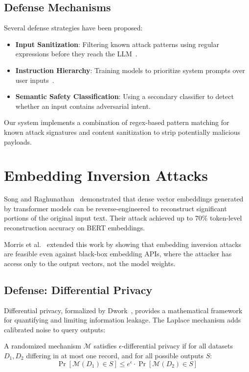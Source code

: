 \subsection{Defense Mechanisms}

Several defense strategies have been proposed:

\begin{itemize}
    \item \textbf{Input Sanitization}: Filtering known attack patterns using regular expressions before they reach the LLM~\cite{liu2023prompt}.
    \item \textbf{Instruction Hierarchy}: Training models to prioritize system prompts over user inputs~\cite{wallace2024instruction}.
    \item \textbf{Semantic Safety Classification}: Using a secondary classifier to detect whether an input contains adversarial intent.
\end{itemize}

Our system implements a combination of regex-based pattern matching for known attack signatures and content sanitization to strip potentially malicious payloads.

\section{Embedding Inversion Attacks}

Song and Raghunathan~\cite{song2020information} demonstrated that dense vector embeddings generated by transformer models can be reverse-engineered to reconstruct significant portions of the original input text. Their attack achieved up to 70\% token-level reconstruction accuracy on BERT embeddings.

Morris et al.~\cite{morris2023text} extended this work by showing that embedding inversion attacks are feasible even against black-box embedding APIs, where the attacker has access only to the output vectors, not the model weights.

\subsection{Defense: Differential Privacy}

Differential privacy, formalized by Dwork~\cite{dwork2006differential}, provides a mathematical framework for quantifying and limiting information leakage. The Laplace mechanism adds calibrated noise to query outputs:

\begin{definition}
A randomized mechanism $\mathcal{M}$ satisfies $\epsilon$-differential privacy if for all datasets $D_1, D_2$ differing in at most one record, and for all possible outputs $S$:
\begin{equation}
    \Pr[\mathcal{M}(D_1) \in S] \leq e^{\epsilon} \cdot \Pr[\mathcal{M}(D_2) \in S]
\end{equation}
\end{definition}

